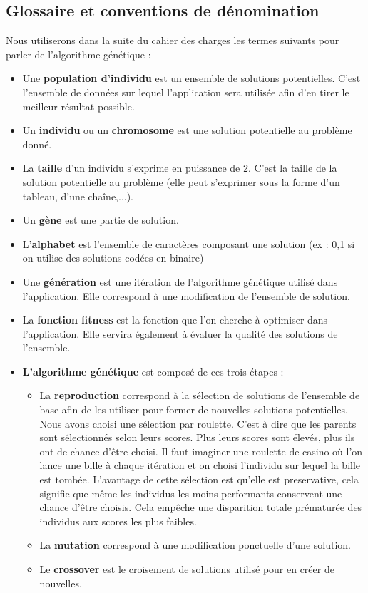 \documentclass[a4paper,11pt]{article}
\begin{document}
		\subsection{Glossaire et conventions de dénomination}
			Nous utiliserons dans la suite du cahier des charges les termes suivants pour parler de l’algorithme génétique :\\
			\begin{itemize}
			\item Une \textbf{population d’individu} est un ensemble de solutions potentielles. C’est l’ensemble de données sur lequel l’application sera utilisée afin d’en tirer le meilleur résultat possible.
			\item Un \textbf{individu} ou un \textbf{chromosome} est une solution potentielle au problème donné.
			\item La \textbf{taille} d’un individu s’exprime en puissance de 2. C’est la taille de la solution potentielle au problème (elle peut s’exprimer sous la forme d’un tableau, d’une chaîne,...).
			\item Un \textbf{gène}  est une partie de solution.
			\item L’\textbf{alphabet} est l’ensemble de caractères composant une solution (ex : {0,1} si on utilise des solutions codées en binaire)
			\item Une \textbf{génération } est une itération de l’algorithme génétique utilisé dans l’application. Elle correspond à une modification de l’ensemble de solution. 
			\item La \textbf{fonction fitness} est la fonction que l’on cherche à optimiser dans l’application. Elle servira également à évaluer la qualité des solutions de l’ensemble.
			\item \textbf{L’algorithme génétique} est composé de ces trois étapes :
				\begin{itemize}
				\item La \textbf{reproduction} correspond à la sélection de solutions de l’ensemble de base afin de les utiliser pour former de nouvelles solutions potentielles.
				Nous avons choisi une sélection par roulette. C'est à dire que les parents sont sélectionnés selon leurs scores. Plus leurs scores sont élevés, plus ils ont de chance d'être choisi.
				Il faut imaginer une roulette de casino où l'on lance une bille à chaque itération et on choisi l'individu sur lequel la bille est tombée. 
				L'avantage de cette sélection est qu'elle est preservative, cela signifie que même les individus les moins performants conservent une chance d’être choisis. 
				Cela empêche une disparition totale prématurée des individus aux scores les plus faibles.
				\item La \textbf{mutation} correspond à une modification ponctuelle d’une solution.
				\item Le \textbf{crossover} est le croisement de solutions utilisé pour en créer de nouvelles.
				\end{itemize}
			\end{itemize}
			
\end{document}
